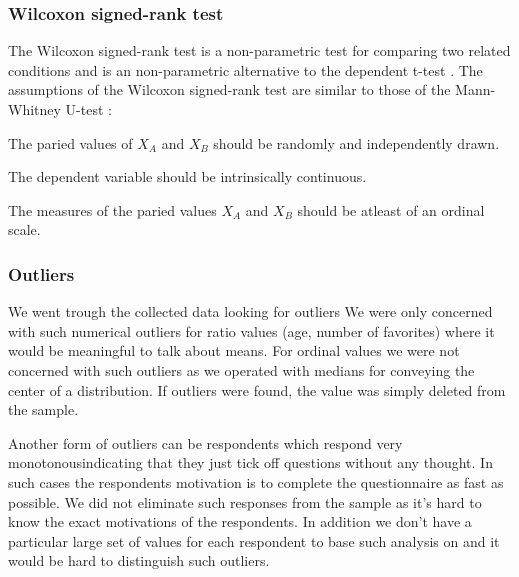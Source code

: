 \subsubsection{Wilcoxon signed-rank test}

The Wilcoxon signed-rank test is a non-parametric test for comparing two
related conditions and is an non-parametric alternative to the
dependent t-test \citep[]{field05}.
The assumptions of the Wilcoxon signed-rank test are similar to those
of the Mann-Whitney U-test \citep[]{lowry08}:

\begin{enum}
  \item The paried values of $X_A$ and $X_B$
    should be randomly and independently drawn.
  \item The dependent variable should be intrinsically continuous.
  \item The measures of the paried values $X_A$ and $X_B$
    should be atleast of an ordinal scale.
\end{enum}


\subsubsection{Outliers}

We went trough the collected data looking for outliers
\dash{}
We were only concerned with such numerical outliers for ratio values
(age, number of favorites) where it would be meaningful to talk about means.
For ordinal values we were not concerned with such outliers as we operated
with medians for conveying the center of a distribution.
If outliers were found, the value was simply deleted from the sample.

Another form of outliers can be respondents which respond very
monotonous\dash{}indicating that they just tick off questions without any
thought. In such cases the respondents motivation is to complete the
questionnaire as fast as possible. We did not eliminate such responses from
the sample as it's hard to know the exact motivations of the respondents.
In addition we don't have a particular large set of values for each respondent
to base such analysis on and it would be hard to distinguish such outliers.

